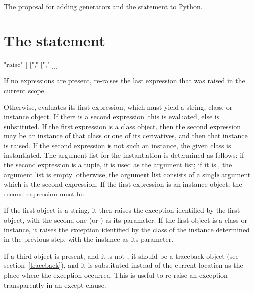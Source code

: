 \begin{seealso}
         {The proposal for adding generators and the 
          statement to Python.}
\end{seealso}


\section{The  statement \label{raise}}

\begin{productionlist}
             {"raise" [ ["," 
              ["," ]]]}
\end{productionlist}

If no expressions are present,  re-raises the last
expression that was raised in the current scope.

Otherwise,  evaluates its first expression, which must yield
a string, class, or instance object.  If there is a second expression,
this is evaluated, else  is substituted.  If the first
expression is a class object, then the second expression may be an
instance of that class or one of its derivatives, and then that
instance is raised.  If the second expression is not such an instance,
the given class is instantiated.  The argument list for the
instantiation is determined as follows: if the second expression is a
tuple, it is used as the argument list; if it is , the
argument list is empty; otherwise, the argument list consists of a
single argument which is the second expression.  If the first
expression is an instance object, the second expression must be
.

If the first object is a string, it then raises the exception
identified by the first object, with the second one (or )
as its parameter.  If the first object is a class or instance,
it raises the exception identified by the class of the instance
determined in the previous step, with the instance as
its parameter.

If a third object is present, and it is not , it should be
a traceback object (see section~\ref{traceback}), and it is
substituted instead of the current location as the place where the
exception occurred.  This is useful to re-raise an exception
transparently in an except clause.


